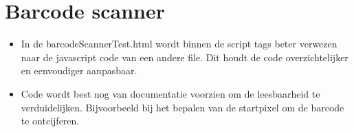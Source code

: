 \documentclass[a4paper,11pt]{article}
\begin{document}
\section{Barcode scanner}

\begin{itemize}
	\item In de barcodeScannerTest.html wordt binnen de script tags beter verwezen naar de javascript code van een andere file. Dit houdt de code overzichtelijker en eenvoudiger aanpasbaar.
	
	\item Code wordt best nog van documentatie voorzien om de leesbaarheid te verduidelijken. Bijvoorbeeld bij het bepalen van de startpixel om de barcode te ontcijferen.
	
\end{itemize}
\end{document}
